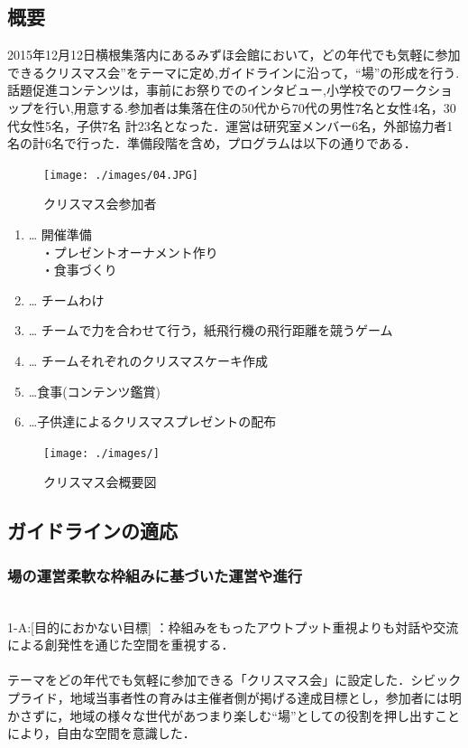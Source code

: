 \documentclass[a4paper]{jsarticle}
\begin{document}
\subsection{概要}
2015年12月12日横根集落内にあるみずほ会館において，どの年代でも気軽に参加できるクリスマス会”をテーマに定め,ガイドラインに沿って，“場”の形成を行う.話題促進コンテンツは，事前にお祭りでのインタビュー,小学校でのワークショップを行い,用意する.参加者は集落在住の50代から70代の男性7名と女性4名，30代女性5名，子供7名 計23名となった．運営は研究室メンバー6名，外部協力者1名の計6名で行った．準備段階を含め，プログラムは以下の通りである．\\
\begin{figure}[H]
  \begin{center}
    \texttt{[image: ./images/04.JPG]}
    \caption{クリスマス会参加者}
    \label{fig:tmu_hino}
  \end{center}
\end{figure}
\begin{enumerate}
\item  … 開催準備\\
　・プレゼントオーナメント作り\\
　・食事づくり
\item  … チームわけ
\item … チームで力を合わせて行う，紙飛行機の飛行距離を競うゲーム
\item  … チームそれぞれのクリスマスケーキ作成
\item …食事(コンテンツ鑑賞)
\item …子供達によるクリスマスプレゼントの配布\\
\end{enumerate}
\begin{figure}[H]
  \begin{center}
    \texttt{[image: ./images/]}
    \caption{クリスマス会概要図}
    \label{fig:tmu_hino}
  \end{center}
\end{figure}

\subsection{ガイドラインの適応}
\subsubsection{場の運営柔軟な枠組みに基づいた運営や進行}\\
1-A:[目的におかない目標] ：枠組みをもったアウトプット重視よりも対話や交流による創発性を通じた空間を重視する．\\\\
テーマをどの年代でも気軽に参加できる「クリスマス会」に設定した．シビックプライド，地域当事者性の育みは主催者側が掲げる達成目標とし，参加者には明かさずに，地域の様々な世代があつまり楽しむ“場”としての役割を押し出すことにより，自由な空間を意識した．\\\\
\end{document}
